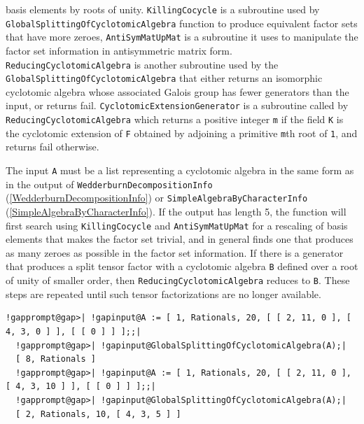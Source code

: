 \documentclass[a4paper,11pt]{report}
\begin{document}
{{{basis elements by roots of unity. \texttt{KillingCocycle} is a subroutine used by \texttt{GlobalSplittingOfCyclotomicAlgebra} function to produce equivalent factor sets that have more zeroes, \texttt{AntiSymMatUpMat} is a subroutine it uses to manipulate the factor set information in
anti\texttt{}symmetric matrix form. \texttt{ReducingCyclotomicAlgebra} is another subroutine used by the \texttt{GlobalSplittingOfCyclotomicAlgebra} that either returns an isomorphic cyclotomic algebra whose associated Galois
group has fewer generators than the input, or returns fail. \texttt{CyclotomicExtensionGenerator} is a subroutine called by \texttt{ReducingCyclotomicAlgebra} which returns a positive integer \texttt{m} if the field \texttt{K} is the cyclotomic extension of \texttt{F} obtained by adjoining a primitive \texttt{m}\texttt{}th root of \texttt{1}, and returns fail otherwise. 



 The input \texttt{A} must be a list representing a cyclotomic algebra in the same form as in the
output of \texttt{WedderburnDecompositionInfo} (\ref{WedderburnDecompositionInfo}) or \texttt{SimpleAlgebraByCharacterInfo} (\ref{SimpleAlgebraByCharacterInfo}). If the output has length 5, the function will first search using \texttt{KillingCocycle} and \texttt{AntiSymMatUpMat} for a rescaling of basis elements that makes the factor set trivial, and in
general finds one that produces as many zeroes as possible in the factor set
information. If there is a generator that produces a split tensor factor with
a cyclotomic algebra \texttt{B} defined over a root of unity of smaller order, then \texttt{ReducingCyclotomicAlgebra} reduces to \texttt{B}. These steps are repeated until such tensor factorizations are no longer
available. 

 
\begin{Verbatim}[commandchars=!@|,fontsize=\small,frame=single,label=Example]
  !gapprompt@gap>| !gapinput@A := [ 1, Rationals, 20, [ [ 2, 11, 0 ], [ 4, 3, 0 ] ], [ [ 0 ] ] ];;|
  !gapprompt@gap>| !gapinput@GlobalSplittingOfCyclotomicAlgebra(A);|
  [ 8, Rationals ]
  !gapprompt@gap>| !gapinput@A := [ 1, Rationals, 20, [ [ 2, 11, 0 ], [ 4, 3, 10 ] ], [ [ 0 ] ] ];;|
  !gapprompt@gap>| !gapinput@GlobalSplittingOfCyclotomicAlgebra(A);|
  [ 2, Rationals, 10, [ 4, 3, 5 ] ]
\end{Verbatim}
 }

 

}}
\end{document}

